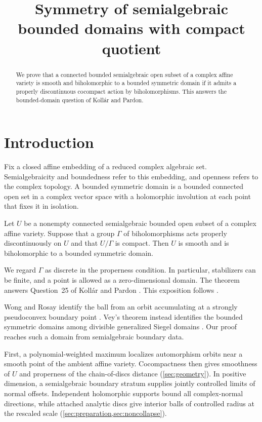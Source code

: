 \documentclass[11pt,a4paper]{amsart}
\title{Symmetry of semialgebraic bounded domains with compact quotient}
\author{}
\date{}
\begin{document}
\begin{abstract}
We prove that a connected bounded semialgebraic open subset of a complex affine variety is smooth and biholomorphic to a bounded symmetric domain if it admits a properly discontinuous cocompact action by biholomorphisms. This answers the bounded-domain question of Koll\'ar and Pardon.
\end{abstract}

\maketitle

\section{Introduction}\label{sec:introduction}

Fix a closed affine embedding of a reduced complex algebraic set. Semialgebraicity and boundedness refer to this embedding, and openness refers to the complex topology. A bounded symmetric domain is a bounded connected open set in a complex vector space with a holomorphic involution at each point that fixes it in isolation.

\begin{maintheorem}\label{thm:main}
Let $U$ be a nonempty connected semialgebraic bounded open subset of a complex affine variety. Suppose that a group $\Gamma$ of biholomorphisms acts properly discontinuously on $U$ and that $U/\Gamma$ is compact. Then $U$ is smooth and is biholomorphic to a bounded symmetric domain.
\end{maintheorem}

We regard $\Gamma$ as discrete in the properness condition. In particular, stabilizers can be finite, and a point is allowed as a zero-dimensional domain. The theorem answers Question~25 of Koll\'ar and Pardon \cite[arXiv version~2, Question~25]{KP2012}. This exposition follows \cite{OpenAIMathSource}.

Wong and Rosay identify the ball from an orbit accumulating at a strongly pseudoconvex boundary point \cite{Wong1977,Rosay1979}. Vey's theorem instead identifies the bounded symmetric domains among divisible generalized Siegel domains \cite[Theorem~1 and the following paragraph]{Vey1970}. Our proof reaches such a domain from semialgebraic boundary data.

First, a polynomial-weighted maximum localizes automorphism orbits near a smooth point of the ambient affine variety. Cocompactness then gives smoothness of $U$ and properness of the chain-of-discs distance (\cref{sec:geometry}). In positive dimension, a semialgebraic boundary stratum supplies jointly controlled limits of normal offsets. Independent holomorphic supports bound all complex-normal directions, while attached analytic discs give interior balls of controlled radius at the rescaled scale (\cref{sec:preparation,sec:noncollapse}).
\end{document}
